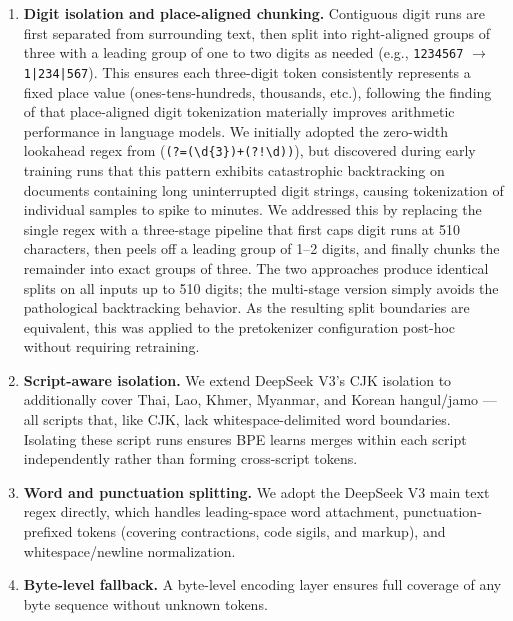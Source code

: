 \documentclass{article}
\begin{document}
\begin{enumerate}
    \item \textbf{Digit isolation and place-aligned chunking.} Contiguous digit runs are first separated from surrounding text, then split into right-aligned groups of three with a leading group of one to two digits as needed (e.g., \texttt{1234567} $\rightarrow$ \texttt{1|234|567}). This ensures each three-digit token consistently represents a fixed place value (ones-tens-hundreds, thousands, etc.), following the finding of \citet{singh2024tokenizationcountsimpacttokenization} that place-aligned digit tokenization materially improves arithmetic performance in language models. We initially adopted the zero-width lookahead regex from \citet{liu2025superbpespacetravellanguage} (\verb|(?=(\d{3})+(?!\d))|), but discovered during early training runs that this pattern exhibits catastrophic backtracking on documents containing long uninterrupted digit strings, causing tokenization of individual samples to spike to minutes. We addressed this by replacing the single regex with a three-stage pipeline that first caps digit runs at 510 characters, then peels off a leading group of 1--2 digits, and finally chunks the remainder into exact groups of three. The two approaches produce identical splits on all inputs up to 510 digits; the multi-stage version simply avoids the pathological backtracking behavior. As the resulting split boundaries are equivalent, this was applied to the pretokenizer configuration post-hoc without requiring retraining.

    \item \textbf{Script-aware isolation.} We extend DeepSeek V3's CJK isolation to additionally cover Thai, Lao, Khmer, Myanmar, and Korean hangul/jamo --- all scripts that, like CJK, lack whitespace-delimited word boundaries. Isolating these script runs ensures BPE learns merges within each script independently rather than forming cross-script tokens.

    \item \textbf{Word and punctuation splitting.} We adopt the DeepSeek V3 main text regex directly, which handles leading-space word attachment, punctuation-prefixed tokens (covering contractions, code sigils, and markup), and whitespace/newline normalization.

    \item \textbf{Byte-level fallback.} A byte-level encoding layer ensures full coverage of any byte sequence without unknown tokens.
\end{enumerate}
\end{document}
